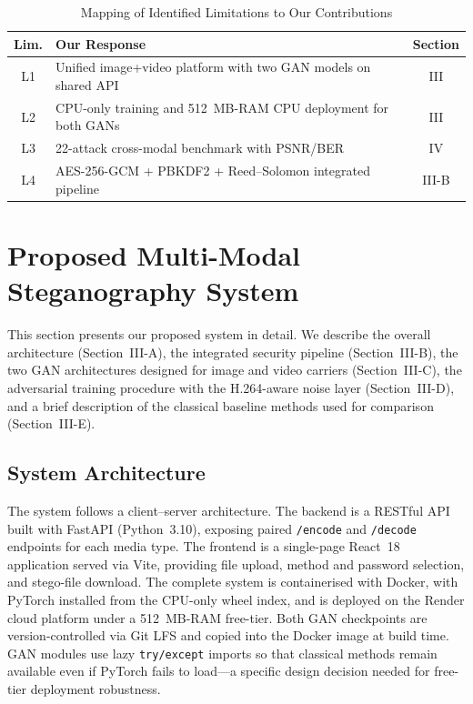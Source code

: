 \documentclass[conference]{IEEEtran}
\begin{document}
\begin{table}[htbp]
\caption{Mapping of Identified Limitations to Our Contributions}
\begin{center}
\begin{tabular}{|c|p{4.7cm}|c|}
\hline
\textbf{Lim.} & \textbf{Our Response} & \textbf{Section} \\
\hline
L1 & Unified image+video platform with two GAN models on shared API & III \\
L2 & CPU-only training and 512~MB-RAM CPU deployment for both GANs & III \\
L3 & 22-attack cross-modal benchmark with PSNR/BER & IV \\
L4 & AES-256-GCM + PBKDF2 + Reed–Solomon integrated pipeline & III-B \\
\hline
\end{tabular}
\label{tab_gap}
\end{center}
\end{table}

\section{Proposed Multi-Modal Steganography System}

This section presents our proposed system in detail. We describe the
overall architecture (Section~III-A), the integrated security
pipeline (Section~III-B), the two GAN architectures designed for
image and video carriers (Section~III-C), the adversarial
training procedure with the H.264-aware noise layer (Section~III-D),
and a brief description of the classical baseline methods used for
comparison (Section~III-E).

\subsection{System Architecture}

The system follows a client–server architecture. The backend is a
RESTful API built with FastAPI (Python~3.10), exposing paired
\texttt{/encode} and \texttt{/decode} endpoints for each media type.
The frontend is a single-page React~18 application served via Vite,
providing file upload, method and password selection, and stego-file
download. The complete system is containerised with Docker, with
PyTorch installed from the CPU-only wheel index, and is deployed on
the Render cloud platform under a 512~MB-RAM free-tier. Both GAN
checkpoints are version-controlled via Git LFS and copied into the
Docker image at build time. GAN modules use lazy \texttt{try/except}
imports so that classical methods remain available even if PyTorch
fails to load—a specific design decision needed for free-tier
deployment robustness.
\end{document}
